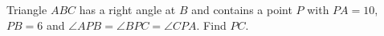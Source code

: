 Triangle $ ABC $ has a right angle at $ B $ and contains a point $ P $ with $ PA=10 $, $ PB=6 $ and $\angle APB=\angle BPC=\angle CPA $. Find $ PC $.
